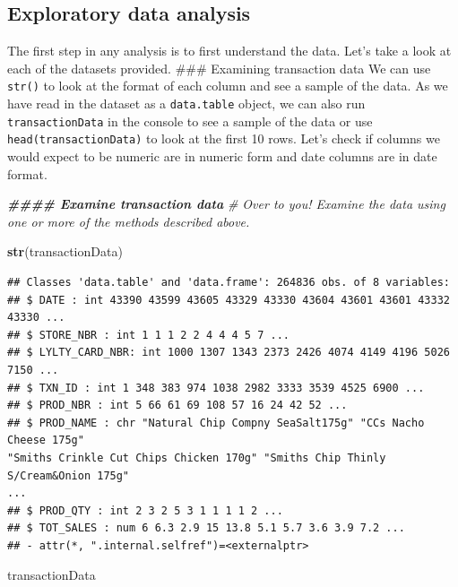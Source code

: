 \documentclass[
]{article}
\newenvironment{Shaded}{\begin{snugshade}}{\end{snugshade}}
\newcommand{\CommentTok}[1]{\textcolor[rgb]{0.56,0.35,0.01}{\textit{#1}}}
\newcommand{\DocumentationTok}[1]{\textcolor[rgb]{0.56,0.35,0.01}{\textbf{\textit{#1}}}}
\newcommand{\FunctionTok}[1]{\textcolor[rgb]{0.13,0.29,0.53}{\textbf{#1}}}
\newcommand{\NormalTok}[1]{#1}
\begin{document}
\hypertarget{exploratory-data-analysis}{%
\subsection{Exploratory data analysis}\label{exploratory-data-analysis}}

The first step in any analysis is to first understand the data. Let's
take a look at each of the datasets provided. \#\#\# Examining
transaction data We can use \texttt{str()} to look at the format of each
column and see a sample of the data. As we have read in the dataset as a
\texttt{data.table} object, we can also run \texttt{transactionData} in
the console to see a sample of the data or use
\texttt{head(transactionData)} to look at the first 10 rows. Let's check
if columns we would expect to be numeric are in numeric form and date
columns are in date format.

\begin{Shaded}
\begin{Highlighting}[]
\DocumentationTok{\#\#\#\# Examine transaction data}
\CommentTok{\# Over to you! Examine the data using one or more of the methods described above.}

\FunctionTok{str}\NormalTok{(transactionData)}
\end{Highlighting}
\end{Shaded}

\begin{verbatim}
## Classes 'data.table' and 'data.frame': 264836 obs. of 8 variables:
## $ DATE : int 43390 43599 43605 43329 43330 43604 43601 43601 43332 43330 ...
## $ STORE_NBR : int 1 1 1 2 2 4 4 4 5 7 ...
## $ LYLTY_CARD_NBR: int 1000 1307 1343 2373 2426 4074 4149 4196 5026 7150 ...
## $ TXN_ID : int 1 348 383 974 1038 2982 3333 3539 4525 6900 ...
## $ PROD_NBR : int 5 66 61 69 108 57 16 24 42 52 ...
## $ PROD_NAME : chr "Natural Chip Compny SeaSalt175g" "CCs Nacho Cheese 175g"
"Smiths Crinkle Cut Chips Chicken 170g" "Smiths Chip Thinly S/Cream&Onion 175g"
...
## $ PROD_QTY : int 2 3 2 5 3 1 1 1 1 2 ...
## $ TOT_SALES : num 6 6.3 2.9 15 13.8 5.1 5.7 3.6 3.9 7.2 ...
## - attr(*, ".internal.selfref")=<externalptr>
\end{verbatim}

\begin{Shaded}
\begin{Highlighting}[]
\NormalTok{transactionData}
\end{Highlighting}
\end{Shaded}
\end{document}
